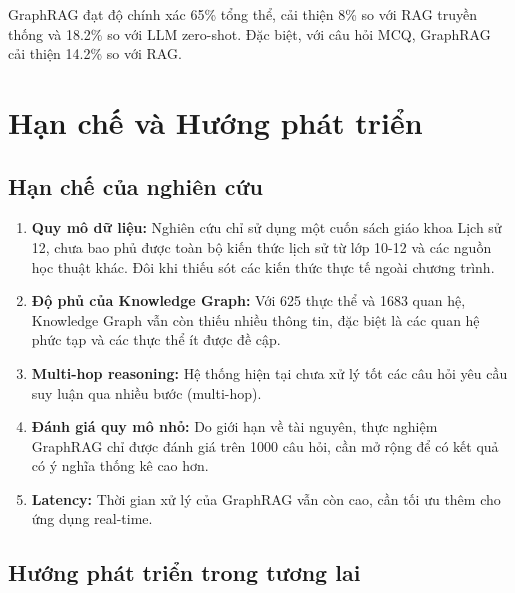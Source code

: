 GraphRAG đạt độ chính xác 65\% tổng thể, cải thiện 8\% so với RAG truyền thống và 18.2\% so với LLM zero-shot. Đặc biệt, với câu hỏi MCQ, GraphRAG cải thiện 14.2\% so với RAG.

\section{Hạn chế và Hướng phát triển}

\subsection{Hạn chế của nghiên cứu}

\begin{enumerate}
    \item \textbf{Quy mô dữ liệu:} Nghiên cứu chỉ sử dụng một cuốn sách giáo khoa Lịch sử 12, chưa bao phủ được toàn bộ kiến thức lịch sử từ lớp 10-12 và các nguồn học thuật khác. Đôi khi thiếu sót các kiến thức thực tế ngoài chương trình.
    
    \item \textbf{Độ phủ của Knowledge Graph:} Với 625 thực thể và 1683 quan hệ, Knowledge Graph vẫn còn thiếu nhiều thông tin, đặc biệt là các quan hệ phức tạp và các thực thể ít được đề cập.
    
    \item \textbf{Multi-hop reasoning:} Hệ thống hiện tại chưa xử lý tốt các câu hỏi yêu cầu suy luận qua nhiều bước (multi-hop).
    
    \item \textbf{Đánh giá quy mô nhỏ:} Do giới hạn về tài nguyên, thực nghiệm GraphRAG chỉ được đánh giá trên 1000 câu hỏi, cần mở rộng để có kết quả có ý nghĩa thống kê cao hơn.
    
    \item \textbf{Latency:} Thời gian xử lý của GraphRAG vẫn còn cao, cần tối ưu thêm cho ứng dụng real-time.
\end{enumerate}

\subsection{Hướng phát triển trong tương lai}

